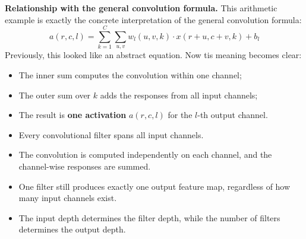 \highspace
\textcolor{Green3}{ \textbf{Relationship with the general convolution formula.}} This arithmetic example is exactly the concrete interpretation of the general convolution formula:
\begin{equation*}
    a(r, c, l) = \sum_{k=1}^{C} \sum_{u, v} w_{l} (u, v, k) \cdot x(r + u, c + v, k) + b_l
\end{equation*}
Previously, this looked like an abstract equation. Now tis meaning becomes clear:
\begin{itemize}
    \item The inner sum computes the convolution within one channel;
    \item The outer sum over $k$ adds the responses from all input channels;
    \item The result is \textbf{one activation} $a(r, c, l)$ for the $l$-th output channel.
\end{itemize}

\highspace
\begin{takeawaysbox}
    \begin{itemize}
        \item Every convolutional filter spans all input channels.
        \item The convolution is computed independently on each channel, and the channel-wise responses are summed.
        \item One filter still produces exactly one output feature map, regardless of how many input channels exist.
        \item The input depth determines the filter depth, while the number of filters determines the output depth.
    \end{itemize}
\end{takeawaysbox}

